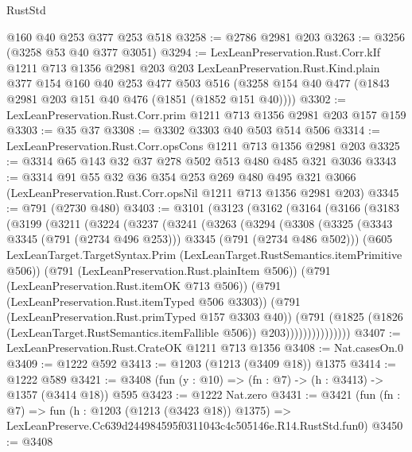 \begin{lexlean}{RustStd}
\begin{coremodule}
    @160
    @40
    @253
    @377
    @253
    @518
@3258 := @2786 @2981 @203
@3263 := @3256 (@3258 @53 @40 @377 @3051)
@3294 := LexLeanPreservation.Rust.Corr.kIf
    @1211
    @713
    @1356
    @2981
    @203
    @203
    LexLeanPreservation.Rust.Kind.plain
    @377
    @154
    @160
    @40
    @253
    @477
    @503
    @516
    (@3258 @154 @40 @477 (@1843 @2981 @203 @151 @40 @476 (@1851 (@1852 @151 @40))))
@3302 := LexLeanPreservation.Rust.Corr.prim @1211 @713 @1356 @2981 @203 @157 @159
@3303 := @35 @37
@3308 := @3302 @3303 @40 @503 @514 @506
@3314 := LexLeanPreservation.Rust.Corr.opsCons @1211 @713 @1356 @2981 @203
@3325 := @3314 @65 @143 @32 @37 @278 @502 @513 @480 @485 @321 @3036
@3343 := @3314
    @91
    @55
    @32
    @36
    @354
    @253
    @269
    @480
    @495
    @321
    @3066
    (LexLeanPreservation.Rust.Corr.opsNil @1211 @713 @1356 @2981 @203)
@3345 := @791 (@2730 @480)
@3403 := @3101
    (@3123
      (@3162
        (@3164
          (@3166
            (@3183
              (@3199
                (@3211
                  (@3224
                    (@3237
                      (@3241
                        (@3263
                          (@3294
                            (@3308
                              (@3325
                                (@3343 @3345 (@791 (@2734 @496 @253)))
                                @3345
                                (@791 (@2734 @486 @502)))
                              (@605
                                LexLeanTarget.TargetSyntax.Prim
                                (LexLeanTarget.RustSemantics.itemPrimitive @506))
                              (@791 (LexLeanPreservation.Rust.plainItem @506))
                              (@791 (LexLeanPreservation.Rust.itemOK @713 @506))
                              (@791 (LexLeanPreservation.Rust.itemTyped @506 @3303))
                              (@791 (LexLeanPreservation.Rust.primTyped @157 @3303 @40))
                              (@791
                                (@1825
                                  (@1826 (LexLeanTarget.RustSemantics.itemFallible @506))
                                  @203)))))))))))))))
@3407 := LexLeanPreservation.Rust.CrateOK @1211 @713 @1356
@3408 := Nat.casesOn.{0}
@3409 := @1222 @592
@3413 := @1203 (@1213 (@3409 @18)) @1375
@3414 := @1222 @589
@3421 := @3408 (fun (y : @10) => (fn : @7) -> (h : @3413) -> @1357 (@3414 @18)) @595
@3423 := @1222 Nat.zero
@3431 := @3421
    (fun (fn : @7) =>
    fun (h : @1203 (@1213 (@3423 @18)) @1375) =>
    LexLeanPreserve.Cc639d244984595f0311043c4c505146e.R14.RustStd.fun0)
@3450 := @3408

\end{coremodule}
\end{lexlean}
